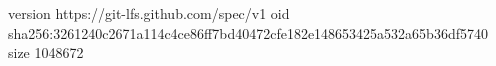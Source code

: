 version https://git-lfs.github.com/spec/v1
oid sha256:3261240c2671a114c4ce86ff7bd40472cfe182e148653425a532a65b36df5740
size 1048672

